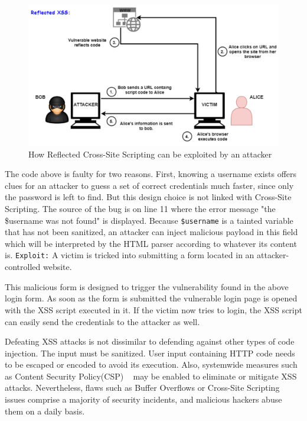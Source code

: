 \begin{figure}[ht]
 \centering
 \captionsetup{justification=centering}
 \includegraphics[width=\linewidth]{figures/reflectedxss.pdf}
 \caption{How Reflected Cross-Site Scripting can be exploited by an attacker}
 \label{fig:reflectedxss}
\end{figure}


The code above is faulty for two reasons. First, knowing a username exists offers clues for an attacker to guess a set of correct credentials much faster, since only the password is left to find. But this design choice is not linked with Cross-Site Scripting. The source of the bug is on line 11 where the error message "the \$username was not found" is displayed. Because {\tt \$username} is a tainted variable that has not been sanitized, an attacker can inject malicious payload in this field which will be interpreted by the HTML parser according to whatever its content is. 
{\tt Exploit:} A victim is tricked into submitting a form located in an attacker-controlled website. 

This malicious form is designed to trigger the vulnerability found in the above login form. As soon as the form is submitted the vulnerable login page is opened with the XSS script executed in it. If the victim now tries to login, the XSS script can easily send the
credentials to the attacker as well. 

Defeating XSS attacks is not dissimilar to defending against other types of code injection.
The input must be sanitized. User input containing HTTP code needs to be escaped or encoded to avoid its execution. Also, systemwide measures
such as Content Security Policy(CSP) ~\cite{csp_def} may be enabled to eliminate or mitigate XSS attacks. Nevertheless, flaws such as Buffer Overflows or Cross-Site Scripting issues comprise a majority of security incidents, and malicious hackers abuse them on a daily basis. 

